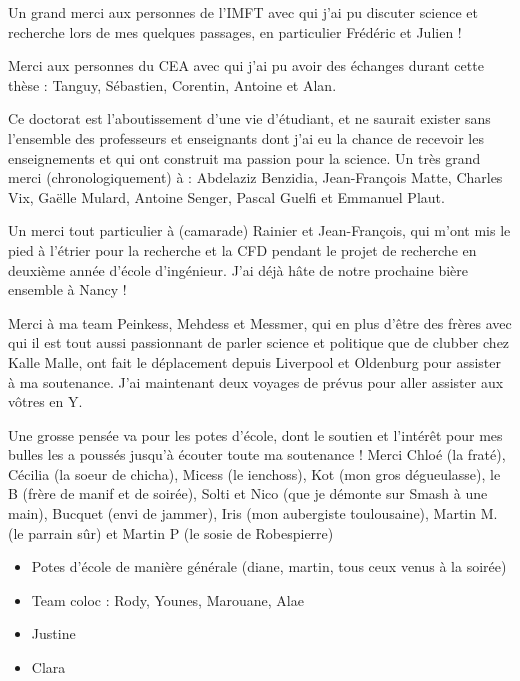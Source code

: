 Un grand merci aux personnes de l'IMFT avec qui j'ai pu discuter science et recherche lors de mes quelques passages, en particulier Frédéric et Julien ! 

\npar

Merci aux personnes du CEA avec qui j'ai pu avoir des échanges durant cette thèse : Tanguy, Sébastien, Corentin, Antoine et Alan.

\npar




Ce doctorat est l'aboutissement d'une vie d'étudiant, et ne saurait exister sans l'ensemble des professeurs et enseignants dont j'ai eu la chance de recevoir les enseignements et qui ont construit ma passion pour la science. Un très grand merci (chronologiquement) à : Abdelaziz Benzidia, Jean-François Matte, Charles Vix, Gaëlle Mulard, Antoine Senger, Pascal Guelfi et Emmanuel Plaut. 

\npar

Un merci tout particulier à (camarade) Rainier et Jean-François, qui m'ont mis le pied à l'étrier pour la recherche et la CFD pendant le projet de recherche en deuxième année d'école d'ingénieur. J'ai déjà hâte de notre prochaine bière ensemble à Nancy !


\npar

Merci à ma team Peinkess, Mehdess et Messmer, qui en plus d'être des frères avec qui il est tout aussi passionnant de parler science et politique que de clubber chez Kalle Malle, ont fait le déplacement depuis Liverpool et Oldenburg pour assister à ma soutenance. J'ai maintenant deux voyages de prévus pour aller assister aux vôtres en Y.

\npar

Une grosse pensée va pour les potes d'école, dont le soutien et l'intérêt pour mes bulles les a poussés jusqu'à écouter toute ma soutenance ! Merci Chloé (la fraté), Cécilia (la soeur de chicha), Micess (le ienchoss), Kot (mon gros dégueulasse), le B (frère de manif et de soirée),  Solti et Nico (que je démonte sur Smash à une main), Bucquet (envi de jammer), Iris (mon aubergiste toulousaine), Martin M. (le parrain sûr) et Martin P (le sosie de Robespierre)


\begin{itemize}
\item Potes d'école de manière générale (diane, martin, tous ceux venus à la soirée)
\item Team coloc : Rody, Younes, Marouane, Alae
\item Justine
\item Clara
\end{itemize}


